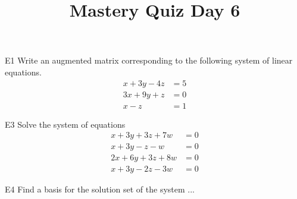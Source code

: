 \documentclass{sbgLAquiz}
\title{Mastery Quiz Day 6 }
\begin{document}
\begin{problem}{E1}
Write an augmented matrix corresponding to the following system of linear equations.
\begin{align*}
x+3y-4z &= 5 \\
3x+9y+z &= 0 \\
x-z &= 1
\end{align*}
\end{problem}

\begin{problem}{E3}
Solve the system of equations
\begin{align*}
x+3y+3z+7w &= 0 \\
 x+3y-z-w &= 0 \\
  2x+6y+3z+8w &= 0 \\
   x+3y-2z-3w &= 0
\end{align*}
\end{problem}
\newpage

\begin{problem}{E4}
Find a basis for the solution set of the system ...
\end{problem}
\end{document}
